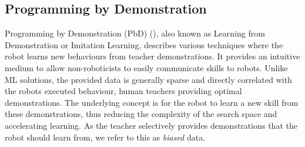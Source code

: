 \subsection{Programming by Demonstration}\label{sssec:PbD}
Programming by Demonstration (PbD) (\cite{billard2016learning,argall2009survey}), also known as Learning from Demonstration or Imitation Learning, describes various techniques where the robot learns new behaviours from teacher demonstrations.
It provides an intuitive medium to allow non-roboticists to easily communicate skills to robots.
Unlike ML solutions, the provided data is generally sparse and directly correlated with the robots executed behaviour, \eg human teachers providing optimal demonstrations.
The underlying concept is for the robot to learn a new skill from these demonstrations, thus reducing the complexity of the search space and accelerating learning.
As the teacher selectively provides demonstrations that the robot should learn from, we refer to this as \textit{biased} data.



